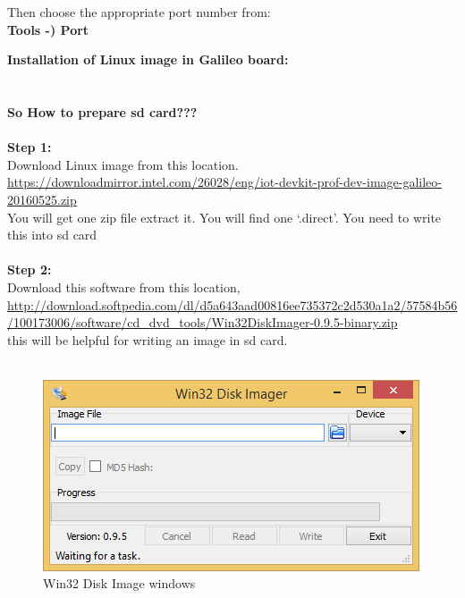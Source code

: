 \documentclass[11pt,a4paper]{article}
\newcommand\tab[1][1cm]{\hspace*{#1}}
\begin{document}
    Then choose the appropriate port number from:\\
\textbf{Tools -) Port}
\newpage

\newpage
\textbf{\huge{Installation of Linux image in Galileo board:}}
	\vspace{1cm}\\
	\tab{In Galileo board, we can install Linux, windows IOT or os x. So the interface with board become easy. Here we will use Linux image. For that, we need to write Linux image on the sd card. From sd card, Galileo board will boot.}\\
	\vspace{.5cm}\\
	\textbf{\Large{So How to prepare sd card???}}\\
	\vspace{.3cm}\\
	\textbf{Step 1:}\\
	Download Linux image from this location.\\
	\url{https://downloadmirror.intel.com/26028/eng/iot-devkit-prof-dev-image-galileo-20160525.zip}\\
	You will get one zip file extract it. You will find one ‘.direct’. You need to write this into sd card\\
	\vspace{.3cm}\\
	\textbf{Step 2:}\\
	Download this software from this location,\\
 \url{http://download.softpedia.com/dl/d5a643aad00816ee735372c2d530a1a2/57584b56/100173006/software/cd_dvd_tools/Win32DiskImager-0.9.5-binary.zip}\\
this will be helpful for writing an image in sd card.\\
\vspace{.3cm}\\
\begin{figure}
	\includegraphics[width=\linewidth]{1.png}
    \caption{Win32 Disk Image windows}
    \end{figure}
\end{document}
